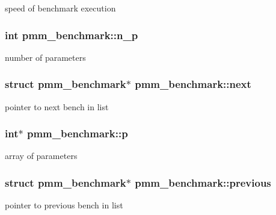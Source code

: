 speed of benchmark execution 

\hypertarget{structpmm__benchmark_a3b5f76d33ecae36cacba87717cd393b6}{
\subsubsection[{n\-\_\-p}]{\setlength{\rightskip}{0pt plus 5cm}int pmm\-\_\-benchmark\-::n\-\_\-p}}\label{structpmm__benchmark_a3b5f76d33ecae36cacba87717cd393b6}


number of parameters 

\hypertarget{structpmm__benchmark_aae543e14825b5772d245f7f4756b4a49}{
\subsubsection[{next}]{\setlength{\rightskip}{0pt plus 5cm}struct {\bf pmm\-\_\-benchmark}$\ast$ pmm\-\_\-benchmark\-::next}}\label{structpmm__benchmark_aae543e14825b5772d245f7f4756b4a49}


pointer to next bench in list 

\hypertarget{structpmm__benchmark_aca03a9b2a577a23fe1c5ade67fe42712}{
\subsubsection[{p}]{\setlength{\rightskip}{0pt plus 5cm}int$\ast$ pmm\-\_\-benchmark\-::p}}\label{structpmm__benchmark_aca03a9b2a577a23fe1c5ade67fe42712}


array of parameters 

\hypertarget{structpmm__benchmark_a03978c97ff1cfa03fd7fffce71044b06}{
\subsubsection[{previous}]{\setlength{\rightskip}{0pt plus 5cm}struct {\bf pmm\-\_\-benchmark}$\ast$ pmm\-\_\-benchmark\-::previous}}\label{structpmm__benchmark_a03978c97ff1cfa03fd7fffce71044b06}


pointer to previous bench in list 

